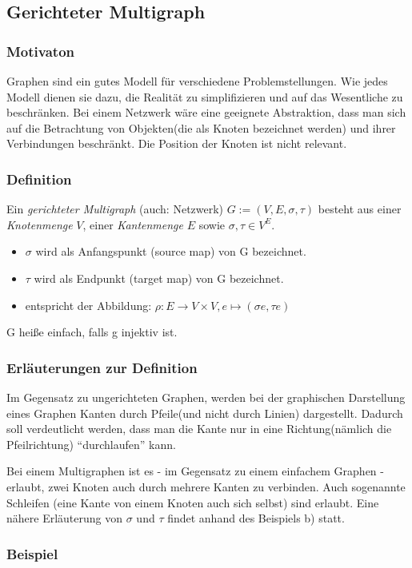 \subsection{Gerichteter Multigraph}
\subsubsection{Motivaton}
Graphen sind ein gutes Modell für verschiedene Problemstellungen.
Wie jedes Modell dienen sie dazu, die Realität zu simplifizieren und auf das Wesentliche zu beschränken.
Bei einem Netzwerk wäre eine geeignete Abstraktion, dass man sich auf die Betrachtung von Objekten(die als Knoten bezeichnet werden) und ihrer Verbindungen beschränkt.
Die Position der Knoten ist nicht relevant.

\subsubsection{Definition}
Ein \emph{gerichteter Multigraph} (auch: Netzwerk) $G:= (V,E,\sigma,\tau) $ besteht aus einer \emph{Knotenmenge} $V$, einer \emph{Kantenmenge} $E$ sowie
$\sigma , \tau \in V^E $.
\begin{itemize}
\item $\sigma $ wird als Anfangspunkt (source map) von G bezeichnet.
\item $\tau $ wird als Endpunkt (target map) von G bezeichnet.
\item entspricht der Abbildung: $\rho : E \rightarrow V \times V, e \mapsto (\sigma e, \tau e) $
\end{itemize}
G heiße einfach, falls g injektiv ist.

\subsubsection{Erläuterungen zur Definition}
Im Gegensatz zu ungerichteten Graphen, werden bei der graphischen Darstellung eines Graphen Kanten durch Pfeile(und nicht durch Linien) dargestellt.
Dadurch soll verdeutlicht werden, dass man die Kante nur in eine Richtung(nämlich die Pfeilrichtung) ``durchlaufen'' kann.

Bei einem Multigraphen ist es - im Gegensatz zu einem einfachem Graphen - erlaubt, zwei Knoten auch durch mehrere Kanten zu verbinden.
Auch sogenannte Schleifen (eine Kante von einem Knoten auch sich selbst) sind erlaubt.
Eine nähere Erläuterung von $\sigma$ und $\tau$ findet anhand des Beispiels b) statt.

\subsubsection{Beispiel}
